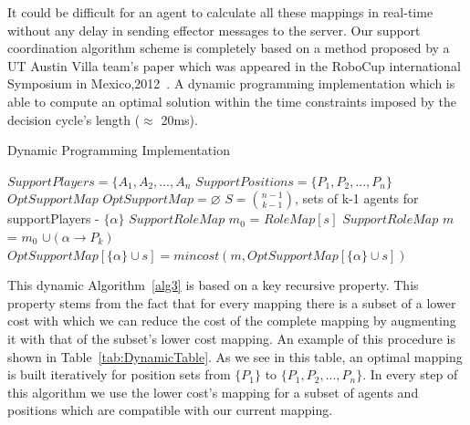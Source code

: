 It could be difficult for an agent to calculate all these mappings in real-time without any delay in sending effector messages to the server. Our support coordination algorithm scheme is completely based on a method proposed by a UT Austin Villa team's paper which was appeared in the RoboCup international Symposium in Mexico,2012~\cite{UtAustinVillaPaper}. A dynamic programming implementation which is able to compute an optimal solution within the time constraints imposed by the decision cycle's length ($\approx$ 20ms).
\begin{algorithm}[ht!]
\caption{Dynamic Programming Implementation}
\label{alg3}
\begin{algorithmic}[1]
$SupportPlayers = \lbrace A_{1},A_{2},...,A_{n} $
\STATE $SupportPositions = \lbrace P_{1},P_{2},...,P_{n} \rbrace $
$OptSupportMap$
\STATE $OptSupportMap = \varnothing $
\STATE $ S = {{n-1}\choose{k-1}} $, sets of k-1 agents for supportPlayers - $\lbrace \alpha \rbrace$
\STATE $SupportRoleMap$ $m_{0}$ = $RoleMap[s]$
\STATE $SupportRoleMap$ $m$ = $m_{0}$ $ \cup (\alpha \rightarrow P_{k})$
\STATE $OptSupportMap[\lbrace \alpha \rbrace \cup s] = mincost(m,OptSupportMap[\lbrace \alpha \rbrace \cup s])$
\ENDFOR
\ENDFOR
\ENDFOR
\end{algorithmic}
\end{algorithm}
This dynamic Algorithm~\ref{alg3} is based on a key recursive property. This property stems from the fact that for every mapping there is a subset of a lower cost with which we can reduce the cost of the complete mapping by augmenting it with that of the subset's lower cost mapping. An example of this procedure is shown in Table~\ref{tab:DynamicTable}. As we see in this table, an optimal mapping is built iteratively for position sets from $\lbrace P_{1} \rbrace$ to $\lbrace P_{1},P_{2},...,P_{n} \rbrace$. In every step of this algorithm we use the lower cost's mapping for a subset of agents and positions which are compatible with our current mapping.
